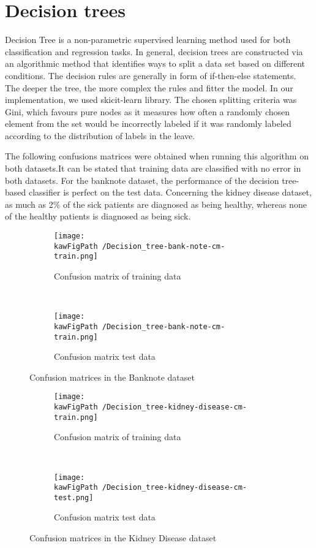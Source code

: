 \documentclass[11pt,a4paper]{article}
\def \kawFigPath {Output/Images}
\begin{document}
\section{Decision trees}
Decision Tree is a non-parametric supervised learning method used for both classification and regression tasks. In general, decision trees are constructed via an algorithmic method that identifies ways to split a data set based on different conditions. The decision rules are generally in form of if-then-else statements. The deeper the tree, the more complex the rules and fitter the model. In our implementation, we used skicit-learn library. The chosen splitting criteria was Gini, which favours pure nodes as it measures how often a randomly chosen element from the set would be incorrectly labeled if it was randomly labeled according to the distribution of labels in the leave. 

The following confusions matrices were obtained when running this algorithm on both datasets.It can be stated that training data are classified with no error in both datasets. For the banknote dataset, the performance of the decision tree-based classifier is perfect on the test data. Concerning the kidney disease dataset, as much as 2\% of the sick patients are diagnosed as being healthy, whereas none of the healthy patients is diagnosed as being sick. 


\begin{figure}[ht]
    \centering
    \begin{subfigure}[b]{0.45\textwidth} %
        \centering \texttt{[image: \\kawFigPath /Decision\_tree-bank-note-cm-train.png]}
        \caption{Confusion matrix of training data}\label{ligne_on}
    \end{subfigure}
    ~
    \begin{subfigure}[b]{0.45\textwidth}
        \centering \texttt{[image: \\kawFigPath /Decision\_tree-bank-note-cm-train.png]}
        \caption{Confusion matrix test data}\label{ligne_off}
    \end{subfigure}
    \caption{Confusion matrices in the Banknote dataset}\label{figxx}
\end{figure}
\begin{figure}[ht]
    \centering
    \begin{subfigure}[b]{0.45\textwidth} %
        \centering \texttt{[image: \\kawFigPath /Decision\_tree-kidney-disease-cm-train.png]}
        \caption{Confusion matrix of training data}\label{ligne_on}
    \end{subfigure}
    ~
    \begin{subfigure}[b]{0.45\textwidth}
        \centering \texttt{[image: \\kawFigPath /Decision\_tree-kidney-disease-cm-test.png]}
        \caption{Confusion matrix test data}\label{ligne_off}
    \end{subfigure}
    \caption{Confusion matrices in the Kidney Disease dataset}\label{figxx}
\end{figure}
\end{document}
